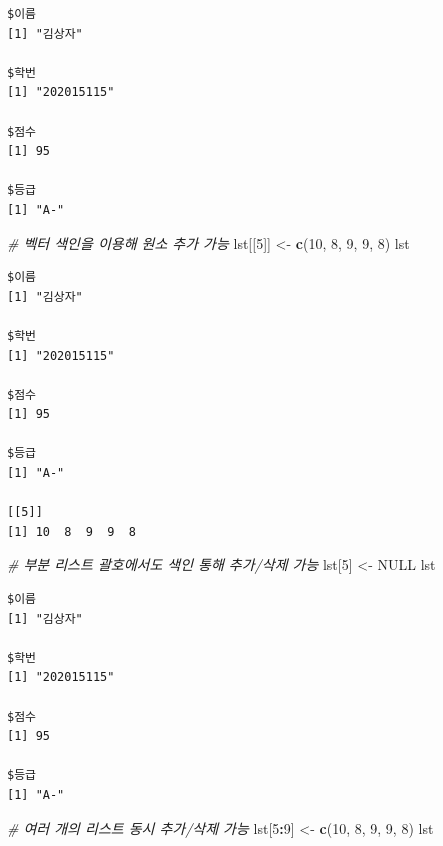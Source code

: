 \documentclass[
  11pt,
]{krantz}
\newenvironment{Shaded}{\begin{snugshade}}{\end{snugshade}}
\newcommand{\CommentTok}[1]{\textcolor[rgb]{0.37,0.37,0.37}{\textit{#1}}}
\newcommand{\DecValTok}[1]{\textcolor[rgb]{0.06,0.06,0.06}{#1}}
\newcommand{\KeywordTok}[1]{\textcolor[rgb]{0.27,0.27,0.27}{\textbf{#1}}}
\newcommand{\NormalTok}[1]{#1}
\newcommand{\OperatorTok}[1]{\textcolor[rgb]{0.43,0.43,0.43}{\textbf{#1}}}
\newcommand{\OtherTok}[1]{\textcolor[rgb]{0.37,0.37,0.37}{#1}}
\newcommand{\StringTok}[1]{\textcolor[rgb]{0.5,0.5,0.5}{#1}}
\begin{document}
\begin{verbatim}
$이름
[1] "김상자"

$학번
[1] "202015115"

$점수
[1] 95

$등급
[1] "A-"
\end{verbatim}

\begin{Shaded}
\begin{Highlighting}[]
\CommentTok{# 벡터 색인을 이용해 원소 추가 가능}
\NormalTok{lst[[}\DecValTok{5}\NormalTok{]] <-}\StringTok{ }\KeywordTok{c}\NormalTok{(}\DecValTok{10}\NormalTok{, }\DecValTok{8}\NormalTok{, }\DecValTok{9}\NormalTok{, }\DecValTok{9}\NormalTok{, }\DecValTok{8}\NormalTok{)}
\NormalTok{lst}
\end{Highlighting}
\end{Shaded}

\begin{verbatim}
$이름
[1] "김상자"

$학번
[1] "202015115"

$점수
[1] 95

$등급
[1] "A-"

[[5]]
[1] 10  8  9  9  8
\end{verbatim}

\begin{Shaded}
\begin{Highlighting}[]
\CommentTok{# 부분 리스트 괄호에서도 색인 통해 추가/삭제 가능}
\NormalTok{lst[}\DecValTok{5}\NormalTok{] <-}\StringTok{ }\OtherTok{NULL}
\NormalTok{lst}
\end{Highlighting}
\end{Shaded}

\begin{verbatim}
$이름
[1] "김상자"

$학번
[1] "202015115"

$점수
[1] 95

$등급
[1] "A-"
\end{verbatim}

\begin{Shaded}
\begin{Highlighting}[]
\CommentTok{# 여러 개의 리스트 동시 추가/삭제 가능}
\NormalTok{lst[}\DecValTok{5}\OperatorTok{:}\DecValTok{9}\NormalTok{] <-}\StringTok{  }\KeywordTok{c}\NormalTok{(}\DecValTok{10}\NormalTok{, }\DecValTok{8}\NormalTok{, }\DecValTok{9}\NormalTok{, }\DecValTok{9}\NormalTok{, }\DecValTok{8}\NormalTok{)}
\NormalTok{lst}
\end{Highlighting}
\end{Shaded}
\end{document}
